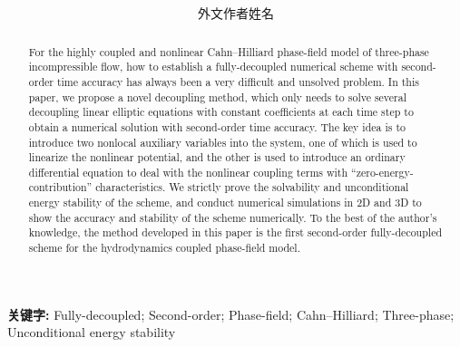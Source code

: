 \newpage
\fancypage{%
	\setlength{\fboxsep}{8pt}%
	\setlength{\fboxrule}{0.8pt}%
	\setlength{\shadowsize}{0pt}%
	\shadowbox}{}
\setcounter{page}{1}


\title{\bf\thestitle}
\author{外文作者姓名}
\date{}

\maketitle         %
\thispagestyle{empty}   %

\begin{abstract}
For the highly coupled and nonlinear Cahn–Hilliard phase-field model of three-phase incompressible flow, how to establish a fully-decoupled numerical scheme with second-order time accuracy has always been a very difficult and unsolved problem. In this paper, we propose a novel decoupling method, which only needs to solve several decoupling linear elliptic equations with constant coefficients at each time step to obtain a numerical solution with second-order time accuracy. The key idea is to introduce two nonlocal auxiliary variables into the system, one of which is used to linearize the nonlinear potential, and the other is used to introduce an ordinary differential equation to deal with the nonlinear coupling terms with “zero-energy- contribution” characteristics. We strictly prove the solvability and unconditional energy stability of the scheme, and conduct numerical simulations in 2D and 3D to show the accuracy and stability of the scheme numerically. To the best of the author’s knowledge, the method developed in this paper is the first second-order fully-decoupled scheme for the hydrodynamics coupled phase-field model.
\end{abstract}

{\bf 关键字:} Fully-decoupled; Second-order; Phase-field; Cahn–Hilliard; Three-phase; Unconditional energy stability

